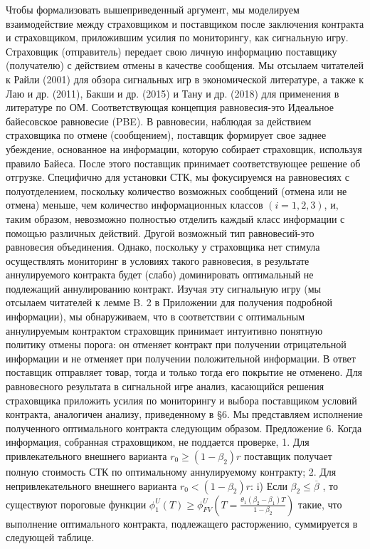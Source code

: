 \documentclass[a4paper,12pt]{article}
\begin{document}
Чтобы формализовать вышеприведенный аргумент, мы моделируем взаимодействие между страховщиком и поставщиком после заключения контракта и страховщиком, приложившим усилия по мониторингу, как сигнальную игру. Страховщик (отправитель) передает свою личную информацию поставщику (получателю) с действием отмены в качестве сообщения. Мы отсылаем читателей к Райли (2001) для обзора сигнальных игр в экономической литературе, а также к Лаю и др. (2011), Бакши и др. (2015) и Тану и др. (2018) для применения в литературе по ОМ. Соответствующая концепция равновесия-это Идеальное байесовское равновесие (PBE). В равновесии, наблюдая за действием страховщика по отмене (сообщением), поставщик формирует свое заднее убеждение, основанное на информации, которую собирает страховщик, используя правило Байеса. После этого поставщик принимает соответствующее решение об отгрузке. Специфично для установки СТК, мы фокусируемся на равновесиях с полуотделением, поскольку количество возможных сообщений (отмена или не отмена) меньше, чем количество информационных классов $(i = 1, 2, 3)$, и, таким образом, невозможно полностью отделить каждый класс информации с помощью различных действий. Другой возможный тип равновесий-это равновесия объединения. Однако, поскольку у страховщика нет стимула осуществлять мониторинг в условиях такого равновесия, в результате аннулируемого контракта будет (слабо) доминировать оптимальный не подлежащий аннулированию контракт.
Изучая эту сигнальную игру (мы отсылаем читателей к лемме B. 2 в Приложении для получения подробной информации), мы обнаруживаем, что в соответствии с оптимальным аннулируемым контрактом страховщик принимает интуитивно понятную политику отмены порога: он отменяет контракт при получении отрицательной информации и не отменяет при получении положительной информации. В ответ поставщик отправляет товар, тогда и только тогда его покрытие не отменено. Для равновесного результата в сигнальной игре анализ, касающийся решения страховщика приложить усилия по мониторингу и выбора поставщиком условий контракта, аналогичен анализу, приведенному в §6. Мы представляем исполнение полученного оптимального контракта следующим образом.
Предложение 6. Когда информация, собранная страховщиком, не поддается проверке,
1. Для привлекательного внешнего варианта $r_{0} \geq (1-\beta_{2})r$ поставщик получает полную стоимость СТК по оптимальному аннулируемому контракту;
2. Для непривлекательного внешнего варианта $r_{0} < (1-\beta_{2})r$:
i) Если $\beta_{2} \leq \overline{\beta}$ , то существуют пороговые функции $\phi_{1}^{U}(T) \geq \phi_{FV}^{U}(T = \frac{\theta_{1}(\beta_{2} - \beta_{1})T}{1-\beta_{2}})$ такие, что выполнение оптимального контракта, подлежащего расторжению, суммируется в следующей таблице.
\end{document}
